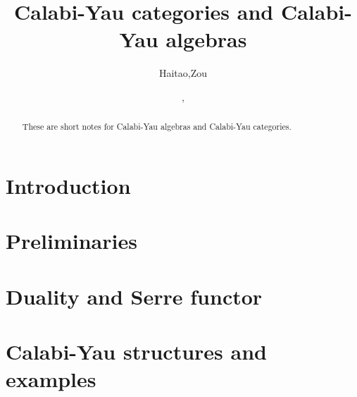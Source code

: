 \documentclass[12pt,twoside]{article}
\title{Calabi-Yau categories and Calabi-Yau algebras}
\date{\number\year, \semester}
\author{Haitao,Zou}
\begin{document}
\maketitle
\begin{abstract}
    These are short notes for Calabi-Yau algebras and Calabi-Yau categories.
\end{abstract}
%
\tableofcontents
\newpage

\section{Introduction}
	
\section{Preliminaries}
	
\section{Duality and Serre functor}
    

\section{Calabi-Yau structures and examples}
%    
%    
\newpage


\end{document}
